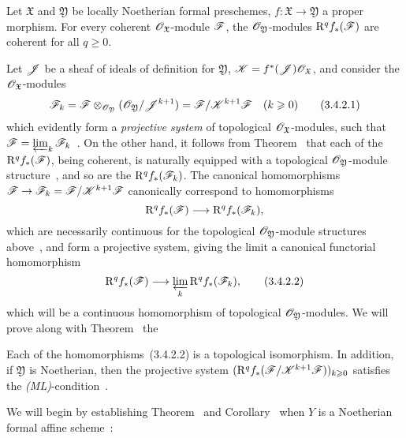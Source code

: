 \begin{theorem}[3.4.2]
\label{III.3.4.2}
Let $\mathfrak{X}$ and $\mathfrak{Y}$ be locally Noetherian formal preschemes, $f:\mathfrak{X}\to\mathfrak{Y}$ a proper morphism.
For every coherent $\mathscr{O}_\mathfrak{X}$-module $\mathscr{F}$, the $\mathscr{O}_\mathfrak{Y}$-modules $\mathrm{R}^q f_*(\mathscr{F})$ are coherent for all $q\geq 0$.
\end{theorem}

Let $\mathscr{J}$ be a sheaf of ideals of definition for $\mathfrak{Y}$, $\mathscr{K}=f^*(\mathscr{J})\mathscr{O}_\mathfrak{X}$, and consider the $\mathscr{O}_\mathfrak{X}$-modules
\[
\label{III.3.4.2.1}
  \mathscr{F}_k=\mathscr{F}\otimes_{\mathscr{O}_\mathfrak{Y}}(\mathscr{O}_\mathfrak{Y}/\mathscr{J}^{k+1})=\mathscr{F}/\mathscr{K}^{k+1}\mathscr{F}\quad(k\geqslant 0)
  \tag{3.4.2.1}
\]
which evidently form a \emph{projective system} of topological $\mathscr{O}_\mathfrak{X}$-modules, such that
$\mathscr{F}=\varprojlim_k\mathscr{F}_k$~.
On the other hand, it follows from Theorem~ that each of the $\mathrm{R}^q f_*(\mathscr{F})$, being coherent, is naturally equipped with a topological $\mathscr{O}_\mathfrak{Y}$-module structure~, and so are the $\mathrm{R}^q f_*(\mathscr{F}_k)$.
The canonical homomorphisms $\sh{F}\to\sh{F}_k=\sh{F}/\sh{K}^{k+1}\sh{F}$ canonically correspond to homomorphisms
\[
  \RR^q f_*(\sh{F})\to\RR^q f_*(\sh{F}_k),
\]
which are necessarily continuous for the topological $\mathscr{O}_\mathfrak{Y}$-module structures above~, and form a projective system, giving the limit a canonical functorial homomorphism
\[
\label{III.3.4.2.2}
  \RR^q f_*(\sh{F})\to\varprojlim_k\RR^q f_*(\sh{F}_k),
  \tag{3.4.2.2}
\]
which will be a continuous homomorphism of topological $\mathscr{O}_\mathfrak{Y}$-modules.
We will prove along with Theorem~ the
\begin{corollary}[3.4.3]
\label{III.3.4.3}
Each of the homomorphisms~(3.4.2.2) is a topological isomorphism.
In addition, if $\mathfrak{Y}$ is Noetherian, then the projective system $(\mathrm{R}^q f_*(\mathscr{F}/\mathscr{K}^{k+1}\mathscr{F}))_{k\geqslant 0}$ satisfies the \emph{(ML)}-condition~.
\end{corollary}
We will begin by establishing Theorem~ and Corollary~ when $Y$ is a Noetherian formal affine scheme~:
